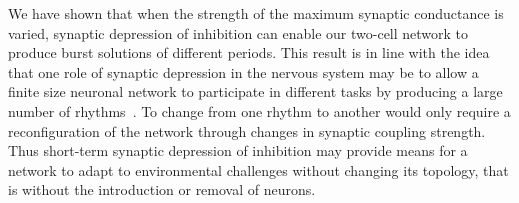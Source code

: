 We have shown that when the strength of the maximum synaptic conductance is varied, synaptic depression of inhibition can enable our two-cell network to produce burst solutions of different periods.
This result is in line with the idea that one role of synaptic depression in the nervous system may be to allow a finite size neuronal network to participate in different tasks by producing a large number of rhythms~\citep{bose2011, jalil2004, li2007}.
To change from one rhythm to another would only require a reconfiguration of the network through changes in synaptic coupling strength.
Thus short-term synaptic depression of inhibition may provide means for a network to adapt to environmental challenges without changing its topology, that is without the introduction or removal of neurons.
